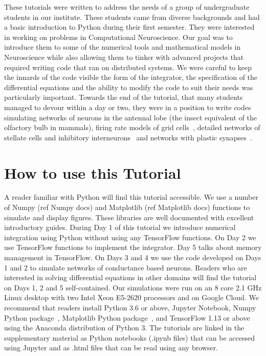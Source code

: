 \documentclass[10pt,letterpaper]{article}
\begin{document}
These tutorials were written to address the needs of a group of undergraduate students in our institute. These students came from diverse backgrounds and had a basic introduction to Python during their first semester. They were interested in working on problems in Computational Neuroscience. Our goal was to introduce them to some of the numerical tools and mathematical models in Neuroscience while also allowing them to tinker with advanced projects that required writing code that ran on distributed systems. We were careful to keep the innards of the code visible \textemdash the form of the integrator, the specification of the differential equations and the ability to modify the code to suit their needs was particularly important. Towards the end of the tutorial, that many students managed to devour within a day or two, they were in a position to write codes simulating networks of neurons in the antennal lobe  \cite{Bazhenov2001}  (the insect equivalent of the olfactory bulb in mammals), firing rate models of grid cells~\cite{Burak2009}, detailed networks of stellate cells and inhibitory interneurons~\cite{Neru2019} and networks with plastic synapses~\cite{Bazhenov2005}. 


\section*{How to use this Tutorial}
A reader familiar with Python will find this tutorial accessible. We use a number of Numpy (ref Numpy docs) and Matplotlib (ref Matplotlib docs) functions to simulate and display figures. These libraries are well documented with excellent introductory guides. During Day 1 of this tutorial we introduce numerical integration using Python without using any TensorFlow functions. On Day 2 we use TensorFlow functions to implement the integrator. Day 5 talks about memory management in TensorFlow. On Days 3 and 4 we use the code developed on Days 1 and 2 to simulate networks of conductance based neurons. Readers who are interested in solving differential equations in other domains will find the tutorial on Days 1, 2 and 5 self-contained.  Our simulations were run on an 8 core 2.1 GHz Linux desktop with two Intel Xeon E5-2620 processors  and on Google Cloud. We recommend that readers install Python 3.6 or above, Jupyter Notebook, Numpy Python package~\cite{numpy}, Matplotlib Python package~\cite{matplotlib}, and TensorFlow 1.13 or above using the Anaconda distribution of Python 3. The tutorials are linked in the supplementary material as Python notebooks (.ipynb files) that can be accessed using Jupyter and as .html files that can be read using any browser.
\end{document}
